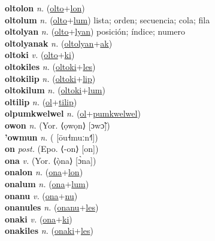 \textbf{oltolon} \textit{n.} (\hyperref[olto]{olto}+\hyperref[lon]{lon})
 \label{oltolon} \\
\textbf{oltolum} \textit{n.} (\hyperref[olto]{olto}+\hyperref[lum]{lum})
lista; orden; secuencia; cola; fila \label{oltolum} \\
\textbf{oltolyan} \textit{n.} (\hyperref[olto]{olto}+\hyperref[lyan]{lyan})
posición; índice; numero \label{oltolyan} \\
\textbf{oltolyanak} \textit{n.} (\hyperref[oltolyan]{oltolyan}+\hyperref[ak]{ak})
 \label{oltolyanak} \\
\textbf{oltoki} \textit{v.} (\hyperref[olto]{olto}+\hyperref[ki]{ki})
 \label{oltoki} \\
\textbf{oltokiles} \textit{n.} (\hyperref[oltoki]{oltoki}+\hyperref[les]{les})
 \label{oltokiles} \\
\textbf{oltokilip} \textit{n.} (\hyperref[oltoki]{oltoki}+\hyperref[lip]{lip})
 \label{oltokilip} \\
\textbf{oltokilum} \textit{n.} (\hyperref[oltoki]{oltoki}+\hyperref[lum]{lum})
 \label{oltokilum} \\
\textbf{oltilip} \textit{n.} (\hyperref[ol]{ol}+\hyperref[tilip]{tilip})
 \label{oltilip} \\
\textbf{olpumkwelwel} \textit{n.} (\hyperref[ol]{ol}+\hyperref[pumkwelwel]{pumkwelwel})
 \label{olpumkwelwel} \\
\textbf{owon} \textit{n.} (Yor. ⟨ọwọn⟩ [ɔwɔ̃])
 \label{owon} \\
\textbf{'owmun} \textit{n.} ( [ōu˧muːn˧˥])
 \label{'owmun} \\
\textbf{on} \textit{post.} (Epo. ⟨-on⟩ [on])
 \label{on} \\
\textbf{ona} \textit{v.} (Yor. ⟨ọ̀na⟩ [ɔ̀na])
 \label{ona} \\
\textbf{onalon} \textit{n.} (\hyperref[ona]{ona}+\hyperref[lon]{lon})
 \label{onalon} \\
\textbf{onalum} \textit{n.} (\hyperref[ona]{ona}+\hyperref[lum]{lum})
 \label{onalum} \\
\textbf{onanu} \textit{v.} (\hyperref[ona]{ona}+\hyperref[nu]{nu})
 \label{onanu} \\
\textbf{onanules} \textit{n.} (\hyperref[onanu]{onanu}+\hyperref[les]{les})
 \label{onanules} \\
\textbf{onaki} \textit{v.} (\hyperref[ona]{ona}+\hyperref[ki]{ki})
 \label{onaki} \\
\textbf{onakiles} \textit{n.} (\hyperref[onaki]{onaki}+\hyperref[les]{les})
 \label{onakiles} \\
